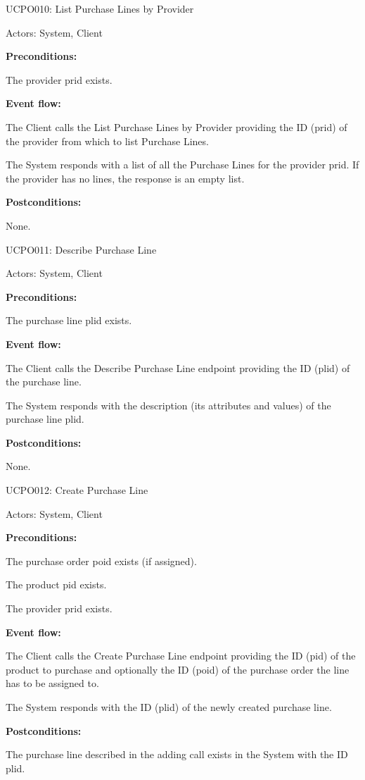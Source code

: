 \begin{ucbox}{UCPO010: List Purchase Lines by Provider}
\label{UCPO010}

Actors: System, Client

\textbf{Preconditions:}

\ucitem The provider prid exists.

\textbf{Event flow:}

\ucitem The Client calls the List Purchase Lines by Provider providing the ID (prid) of the provider from which to list Purchase Lines.

\ucitem The System responds with a list of all the Purchase Lines for the provider prid. If the provider has no lines, the response is an empty list.

\textbf{Postconditions:}

\ucitem None.

\end{ucbox}

\begin{ucbox}{UCPO011: Describe Purchase Line}
\label{UCPO011}

Actors: System, Client

\textbf{Preconditions:}

\ucitem The purchase line plid exists.

\textbf{Event flow:}

\ucitem The Client calls the Describe Purchase Line endpoint providing the ID (plid) of the purchase line.

\ucitem The System responds with the description (its attributes and values) of the purchase line plid.

\textbf{Postconditions:}

\ucitem None.

\end{ucbox}

\begin{ucbox}{UCPO012: Create Purchase Line}
\label{UCPO012}

Actors: System, Client

\textbf{Preconditions:}

\ucitem The purchase order poid exists (if assigned).

\ucitem The product pid exists.

\ucitem The provider prid exists.

\textbf{Event flow:}

\ucitem The Client calls the Create Purchase Line endpoint providing the ID (pid) of the product to purchase and optionally the ID (poid) of the purchase order the line has to be 
assigned to.

\ucitem The System responds with the ID (plid) of the newly created purchase line.

\textbf{Postconditions:}

\ucitem The purchase line described in the adding call exists in the System with the ID plid.

\end{ucbox}


